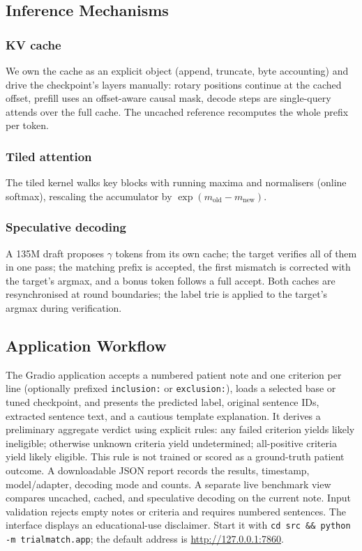 \documentclass[conference]{IEEEtran}
\begin{document}
\subsection{Inference Mechanisms}
\subsubsection{KV cache} We own the cache as an explicit object (append, truncate, byte
accounting) and drive the checkpoint's layers manually: rotary positions continue at the
cached offset, prefill uses an offset-aware causal mask, decode steps are single-query
attends over the full cache. The uncached reference recomputes the whole prefix per token.
\subsubsection{Tiled attention} The tiled kernel walks key blocks with running maxima and
normalisers (online softmax), rescaling the accumulator by $\exp(m_{\text{old}}-m_{\text{new}})$.
\subsubsection{Speculative decoding} A 135M draft proposes $\gamma$ tokens from its own
cache; the target verifies all of them in one pass; the matching prefix is accepted, the
first mismatch is corrected with the target's argmax, and a bonus token follows a full
accept. Both caches are resynchronised at round boundaries; the label trie is applied to
the target's argmax during verification.

\subsection{Application Workflow}
The Gradio application accepts a numbered patient note and one criterion per line
(optionally prefixed \texttt{inclusion:} or \texttt{exclusion:}), loads a selected base
or tuned checkpoint, and presents the predicted label, original sentence IDs, extracted
sentence text, and a cautious template explanation. It derives a preliminary aggregate
verdict using explicit rules: any failed criterion yields likely ineligible; otherwise
unknown criteria yield undetermined; all-positive criteria yield likely eligible. This
rule is not trained or scored as a ground-truth patient outcome. A downloadable JSON
report records the results, timestamp, model/adapter, decoding mode and counts.
A separate live benchmark view compares uncached, cached, and speculative decoding on
the current note. Input validation rejects empty notes or criteria and requires numbered
sentences. The interface displays an educational-use disclaimer. Start it with
\texttt{cd src \&\& python -m trialmatch.app}; the default address is
\url{http://127.0.0.1:7860}.
\end{document}
